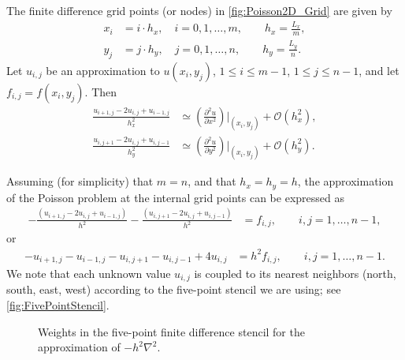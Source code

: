 The finite difference grid points (or nodes) in \autoref{fig:Poisson2D_Grid} are
given by
\begin{align*}
  x_i &= i \cdot h_x, \quad i=0,1,\ldots,m, \qquad h_x = \frac{L_x}{m}, \\
  y_j &= j \cdot h_y, \quad j=0,1,\ldots,n, \qquad h_y = \frac{L_y}{n}.
\end{align*}
Let $u_{i,j}$ be an approximation to $u(x_i,y_j)$, $1\leq i\leq m-1$, $1\leq
j\leq n-1$, and let $f_{i,j} = f(x_i,y_j)$. Then
\begin{align*}
  \frac{u_{i+1,j} - 2 u_{i,j} + u_{i-1,j}}{h_x^2}
  &\simeq \left( \frac{\partial^2 u}{\partial x^2} \right) \biggl|_{(x_i,y_j)} + \mathcal{O}(h_x^2), \\
  \frac{u_{i,j+1} - 2 u_{i,j} + u_{i,j-1}}{h_y^2}
  &\simeq \left( \frac{\partial^2 u}{\partial y^2} \right) \biggl|_{(x_i,y_j)} + \mathcal{O}(h_y^2).
\end{align*}

Assuming (for simplicity) that $m=n$, and that $h_x=h_y=h$, the approximation of
the Poisson problem at the internal grid points can be expressed as
\begin{align*}
  -\frac{(u_{i+1,j}-2u_{i,j}+u_{i-1,j})}{h^2}
  -\frac{(u_{i,j+1}-2u_{i,j}+u_{i,j-1})}{h^2}
  &= f_{i,j}, \qquad i,j=1,\ldots,n-1,
\end{align*}
or
\begin{align}
  -u_{i+1,j}-u_{i-1,j}-u_{i,j+1}-u_{i,j-1}+4u_{i,j} &= h^2 f_{i,j}, \qquad i,j=1,\ldots,n-1.
  \label{eq:Poisson2D_disc}
\end{align}
We note that each unknown value $u_{i,j}$ is coupled to its nearest neighbors
(north, south, east, west) according to the five-point stencil we are using; see
\autoref{fig:FivePointStencil}.

\begin{figure}
  \centering
  
  \caption{
    Weights in the five-point finite difference stencil for the approximation of
    $-h^2\nabla^2$.
  }
  \label{fig:FivePointStencil}
\end{figure}

